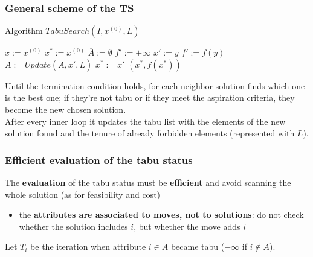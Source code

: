 \documentclass[11pt]{article}
\begin{document}
	\newpage
	
	\subsubsection{General scheme of the TS}
	
	\begin{algorithm}
		\caption{Algorithm $TabuSearch(I , x^{(0)}, L)$}
		\begin{algorithmic}
			\STATE $x := x^{(0)}$ 
			\STATE $x^\ast := x^{(0)}$
			\STATE $\overline{A} := \emptyset$
				\STATE $f' := + \infty$
						\STATE $x' := y$
						\STATE $f' := f (y )$
					\ENDIF
				\ENDIF
				\ENDFOR
				\STATE $\overline{A} := Update( \overline{A}, x', L)$
					\STATE $x^\ast := x'$
				\ENDIF
			\ENDWHILE
			\RETURN $(x^\ast, f (x^\ast))$
		\end{algorithmic}
	\end{algorithm}
	
	Until the termination condition holds, for each neighbor solution finds which one is the best one; if they're not tabu or if they meet the aspiration criteria, they become the new chosen solution.\\
	After every inner loop it updates the tabu list with the elements of the new solution found and the tenure of already forbidden elements (represented with $L$).\\
	
	\newpage
	
	\subsubsection{Efficient evaluation of the tabu status}
	
	The \textbf{evaluation} of the tabu status must be \textbf{efficient} and avoid scanning the whole solution (as for feasibility and cost)
	\begin{itemize}
		\item the \textbf{attributes are associated to moves, not to solutions}: do not check whether the solution includes $i$, but whether the move adds $i$
	\end{itemize}
	
	Let $T_i$ be the iteration when attribute $i \in A$ became tabu ($-\infty$ if $i \notin \overline{A}$).\\
	
\end{document}
